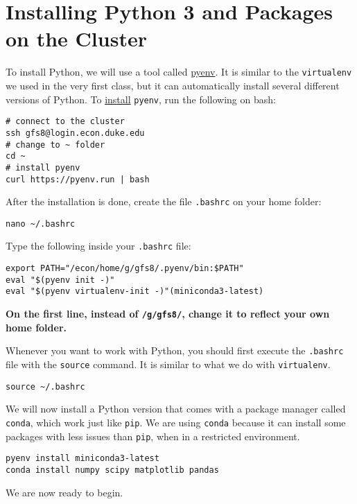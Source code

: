 \documentclass[12pt, a4paper]{article}
\begin{document}
\section{Installing Python 3 and Packages on the Cluster}
\label{sec:orgef68c95}
To install Python, we will use a tool called \href{https://github.com/pyenv/pyenv}{pyenv}.
It is similar to the \texttt{virtualenv} we used in the very first class, but it can automatically install several different versions of Python.
To \href{https://github.com/pyenv/pyenv-installer}{install} \texttt{pyenv}, run the following on bash:
\lstset{language=bash,label= ,caption= ,captionpos=b,firstnumber=1,numbers=left,style=bash}
\begin{lstlisting}
# connect to the cluster
ssh gfs8@login.econ.duke.edu
# change to ~ folder
cd ~
# install pyenv
curl https://pyenv.run | bash
\end{lstlisting}
After the installation is done, create the file \texttt{.bashrc} on your home folder:
\lstset{language=bash,label= ,caption= ,captionpos=b,firstnumber=1,numbers=left,style=bash}
\begin{lstlisting}
nano ~/.bashrc
\end{lstlisting}
Type the following inside your \texttt{.bashrc} file:
\lstset{language=bash,label= ,caption= ,captionpos=b,firstnumber=1,numbers=left,style=bash}
\begin{lstlisting}
export PATH="/econ/home/g/gfs8/.pyenv/bin:$PATH"
eval "$(pyenv init -)"
eval "$(pyenv virtualenv-init -)"(miniconda3-latest)
\end{lstlisting}
\textbf{On the first line, instead of \texttt{/g/gfs8/}, change it to reflect your own home folder.}

Whenever you want to work with Python, you should first execute the \texttt{.bashrc} file with the \texttt{source} command.
It is similar to what we do with \texttt{virtualenv}.
\lstset{language=bash,label= ,caption= ,captionpos=b,firstnumber=1,numbers=left,style=bash}
\begin{lstlisting}
source ~/.bashrc
\end{lstlisting}
We will now install a Python version that comes with a package manager called \texttt{conda}, which work just like \texttt{pip}.
We are using \texttt{conda} because it can install some packages with less issues than \texttt{pip}, when in a restricted environment.
\lstset{language=bash,label= ,caption= ,captionpos=b,firstnumber=1,numbers=left,style=bash}
\begin{lstlisting}
pyenv install miniconda3-latest
conda install numpy scipy matplotlib pandas
\end{lstlisting}
We are now ready to begin.
\end{document}
